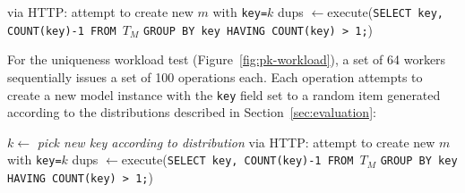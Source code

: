 \begin{algorithm}[h!]
\begin{algorithmic}
      \State via HTTP: attempt to create new $m$ with \texttt{key=$k$}
     \EndParFor
   \EndFor
   \State dups $\gets $execute(\texttt{SELECT key, COUNT(key)-1 FROM $T_M$}
   \State \hspace{6.5em}\texttt{GROUP BY key HAVING COUNT(key) > 1;})
\EndFor
\end{algorithmic}
\end{algorithm}

 For the uniqueness workload test (Figure~\ref{fig:pk-workload}), a set of 64 workers sequentially issues a set of 100 operations each. Each operation attempts to create a new model instance with the \texttt{key} field set to a random item generated according to the distributions described in Section~\ref{sec:evaluation}:

\begin{algorithm}[h!]
\begin{algorithmic}
      \State $k \gets$ \textit{pick new key according to distribution}
      \State via HTTP: attempt to create new $m$ with \texttt{key=$k$}
     \EndFor
   \EndParFor
   \State dups $\gets $execute(\texttt{SELECT key, COUNT(key)-1 FROM $T_M$}
   \State \hspace{6.5em}\texttt{GROUP BY key HAVING COUNT(key) > 1;})
\EndFor
\end{algorithmic}
\end{algorithm}